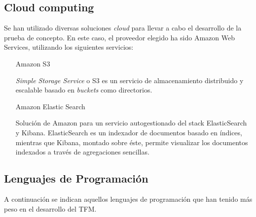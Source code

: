\subsection{Cloud computing}

Se han utilizado diversas soluciones \textit{cloud} para llevar a cabo el
desarrollo de la prueba de concepto. En este caso, el proveedor elegido ha sido
Amazon Web Services, utilizando los siguientes servicios:

\begin{itemize}
\item[Amazon S3]

  \textit{Simple Storage Service} o S3 es un servicio de almacenamiento
  distribuido y escalable basado en \textit{buckets} como directorios.
  
\item[Amazon Elastic Search]

  Solución de Amazon para un servicio autogestionado del stack ElasticSearch y
  Kibana. ElasticSearch es un indexador de documentos basado en índices,
  mientras que Kibana, montado sobre éste, permite visualizar los documentos
  indexados a través de agregaciones sencillas. 
\end{itemize}

\subsection{Lenguajes de Programación}

A continuación se indican aquellos lenguajes de programación que han tenido más
peso en el desarrollo del \acs{TFM}. 

